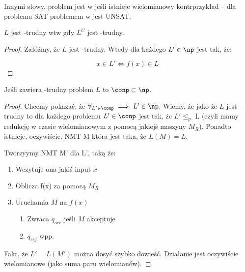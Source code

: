 Innymi słowy, problem jest w \conp jeśli istnieje wielomianowy kontrprzykład -- dla problemu SAT problemem w \conp jest UNSAT.

\begin{theorem}
    \(L\) jest \np-trudny wtw gdy \(L^C\) jest \conp-trudny. 
\end{theorem}

\begin{proof}
    Załóżmy, że $L$ jest \np-trudny. Wtedy dla każdego \(L' \in \np\) jest tak, że:
    
    \begin{equation*}
        x \in L' \iff f(x) \in L 
    \end{equation*}
    
\end{proof}

\begin{theorem}
    Jeśli \np zawiera \conp-trudny problem \( L \) to \( \conp \subset \np \). 
\end{theorem}

\begin{proof}
    Chcemy pokazać, że \( \forall_{L' \in \conp} \implies L' \in \np \).
    Wiemy, że jako że \(L\) jest \conp-trudny to dla każdego problemu \(L' \in \conp\) jest tak, że \(L' \leq_p \) L (czyli mamy redukcję w czasie wielomianowym z pomocą jakiejś maszyny \(M_R\)). Ponadto istnieje, oczywiście, NMT M która jest taka, że \(L(M) = L \). 
    
    Tworzyymy NMT M' dla L', taką że:
    
    \begin{enumerate}
        \item Wczytuje ona jakiś input \(x\)
        \item Oblicza f(x) za pomocą \(M_R\)
        \item Uruchamia \(M\) na \(f(x)\)
        
        \begin{enumerate}
            \item Zwraca \(q_{acc}\) jeśli \(M\) akceptuje 
            \item \(q_{rej} \) wpp.
        \end{enumerate}
    \end{enumerate}
    
    Fakt, że \( L' = L(M') \) można dosyć szybko dowieść. Działanie jest oczywiście wielomianowe (jako suma paru wielomianów). 

\end{proof}

